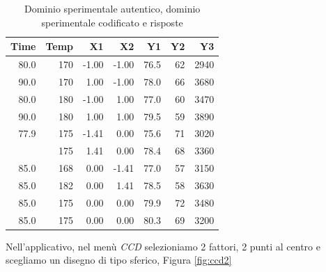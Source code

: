 \documentclass[
  11pt,
]{book}
\begin{document}
\begin{table}

\caption{\label{tab:esmatrmod}Dominio sperimentale autentico, dominio sperimentale
codificato e risposte}
\centering
\begin{tabular}[t]{rrrrrrr}
\toprule
Time & Temp & X1 & X2 & Y1 & Y2 & Y3\\
\midrule
80.0 & 170 & -1.00 & -1.00 & 76.5 & 62 & 2940\\
90.0 & 170 & 1.00 & -1.00 & 78.0 & 66 & 3680\\
80.0 & 180 & -1.00 & 1.00 & 77.0 & 60 & 3470\\
90.0 & 180 & 1.00 & 1.00 & 79.5 & 59 & 3890\\
77.9 & 175 & -1.41 & 0.00 & 75.6 & 71 & 3020\\
\addlinespace
92.1 & 175 & 1.41 & 0.00 & 78.4 & 68 & 3360\\
85.0 & 168 & 0.00 & -1.41 & 77.0 & 57 & 3150\\
85.0 & 182 & 0.00 & 1.41 & 78.5 & 58 & 3630\\
85.0 & 175 & 0.00 & 0.00 & 79.9 & 72 & 3480\\
85.0 & 175 & 0.00 & 0.00 & 80.3 & 69 & 3200\\
\bottomrule
\end{tabular}
\end{table}

Nell'applicativo, nel menù \emph{CCD} selezioniamo 2 fattori, 2 punti al centro e scegliamo un disegno di tipo sferico, Figura \ref{fig:ccd2}
\newpage
\end{document}
